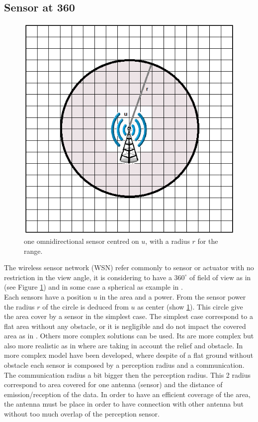 	\subsection{Sensor at 360}
	\begin{figure}[t!]
   \includegraphics[width=\linewidth]{img/WsnSensor1.png}
  \caption{ one omnidirectional sensor centred on $u$, with a radius $r$ for the range.}\label{fig:WsnSensor1}
  \endminipage\hfill
\end{figure}

The wireless sensor network (WSN) refer commonly to sensor or actuator  with no restriction in the view angle, it is considering to have a $360^\circ$ of field of view  as in \cite{200*kulkarni2011, 174*zhang2016,150*chakrabarty2002} (see Figure \ref{fig:WsnSensor1}) and in some case a spherical as example in \cite{175*medhi2013,59*wang2008}.  \\

Each sensors have a position $u$ in the area and a power. From the sensor power the radius $r$ of the circle is deduced from $u$ as center (show \ref{fig:WsnSensor1}). This circle give the area cover by a sensor in the simplest case. 
The simplest case correspond to a flat area without any obstacle, or it is negligible and do not impact the covered area as in \cite{200*kulkarni2011,174*zhang2016}.  
Others more complex solutions can be used. Its are more complex but also more realistic as in \cite{59*wang2008} where are taking in account the relief and obstacle. 
In \cite{174*zhang2016} more complex model have been developed, where despite of a flat ground without obstacle each sensor is composed by a perception radius and a communication. The communication radius a bit bigger then the perception radius. This 2 radius correspond to area covered for one antenna (sensor) and the distance of emission/reception of the data.  In order to have an efficient coverage of the area, the antenna must be place in order to have connection with other antenna but without too much overlap of the perception sensor.\\

